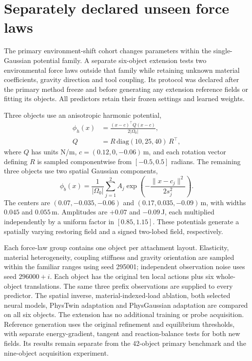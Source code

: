 \documentclass[10pt,twocolumn,letterpaper]{article}
\begin{document}
\section{Separately declared unseen force laws}
The primary environment-shift cohort changes parameters within the single-Gaussian potential family. A separate six-object extension tests two environmental force laws outside that family while retaining unknown material coefficients, gravity direction and tool coupling. Its protocol was declared after the primary method freeze and before generating any extension reference fields or fitting its objects. All predictors retain their frozen settings and learned weights.

Three objects use an anisotropic harmonic potential,
\begin{equation}
 \begin{aligned}
 \phi_h(x)&=\frac{(x-c)^\top Q(x-c)}{2|\Omega_0|},\\
 Q&=R\,\mathrm{diag}(10,25,40)\,R^\top,
 \end{aligned}
\end{equation}
where $Q$ has units N/m, $c=(0.12,0,-0.06)$\,m, and each rotation vector defining $R$ is sampled componentwise from $[-0.5,0.5]$ radians. The remaining three objects use two spatial Gaussian components,
\begin{equation}
 \phi_b(x)=\frac{1}{|\Omega_0|}\sum_{j=1}^2 A_j
 \exp\left(-\frac{\|x-c_j\|^2}{2s_j^2}\right).
\end{equation}
The centers are $(0.07,-0.035,-0.06)$ and $(0.17,0.035,-0.09)$\,m, with widths $0.045$ and $0.055$\,m. Amplitudes are $+0.07$ and $-0.09$\,J, each multiplied independently by a uniform factor in $[0.85,1.15]$. These potentials generate a spatially varying restoring field and a signed two-lobed field, respectively.

Each force-law group contains one object per attachment layout. Elasticity, material heterogeneity, coupling stiffness and gravity orientation are sampled within the familiar ranges using seed 295001; independent observation noise uses seed $296000+i$. Each object has the original ten local actions plus six whole-object translations. The same three prefix observations are supplied to every predictor. The spatial inverse, material-indexed-load ablation, both selected neural models, PhysTwin adaptation and PhysGaussian adaptation are compared on all six objects. The extension has no additional training or probe acquisition. Reference generation uses the original refinement and equilibrium thresholds, with separate energy-gradient, tangent and reaction-balance tests for both new fields. Its results remain separate from the 42-object primary benchmark and the nine-object acquisition experiment.
\end{document}
